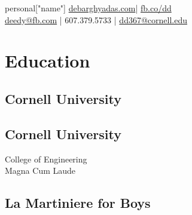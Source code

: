 \documentclass[]{cv}
\begin{document}
    
    \lastupdated
    

    \namesection
    {
        {{ personal["name"] }}
    }
    { 
        \href{http://debarghyadas.com}{debarghyadas.com}| \href{http://fb.co/dd}{fb.co/dd} \\
        \href{mailto:deedy@fb.com}{deedy@fb.com} | 607.379.5733 | \href{mailto:dd367@cornell.edu}{dd367@cornell.edu}
    }
    
    
    \begin{minipage}[t]{0.33\textwidth} 
    
    
    \section{Education} 
    
    \subsection{Cornell University}
    \sectionsep
    
    \subsection{Cornell University}
    College of Engineering \\
    Magna Cum Laude\\
    \sectionsep
    
    \subsection{La Martiniere for Boys}
    \sectionsep
    
    

\end{minipage}
\end{document}
